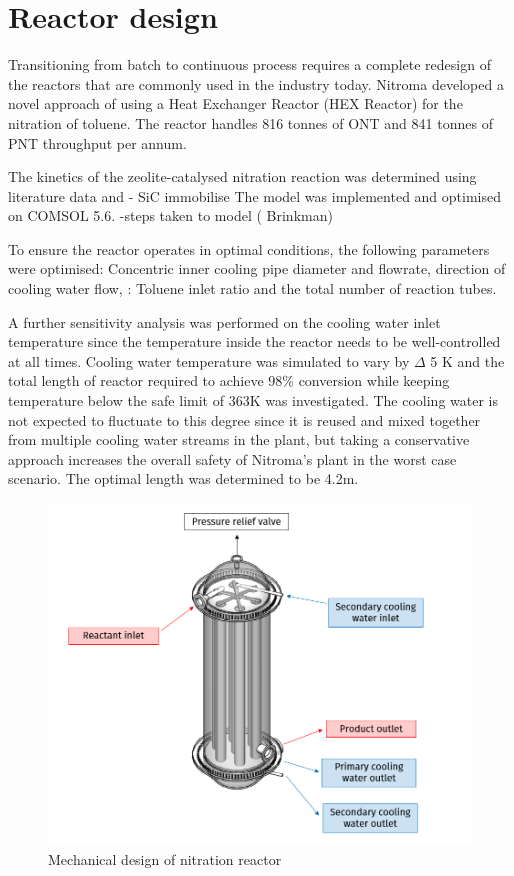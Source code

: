 \section*{Reactor design}
Transitioning from batch to continuous process requires a complete redesign of the reactors that are commonly used in the industry today. Nitroma developed a novel approach of using a Heat Exchanger Reactor (HEX Reactor) for the nitration of toluene. The reactor handles 816 tonnes of ONT and 841 tonnes of PNT throughput per annum. 

The kinetics of the zeolite-catalysed nitration reaction was determined using literature data and 
- SiC immobilise
The model was implemented and optimised on COMSOL 5.6. 
-steps taken to model ( Brinkman) 

To ensure the reactor operates in optimal conditions, the following parameters were optimised: Concentric inner cooling pipe diameter and flowrate, direction of cooling water flow,  : Toluene inlet ratio and the total number of reaction tubes.



A further sensitivity analysis was performed on the cooling water inlet temperature since the temperature inside the reactor needs to be well-controlled at all times. Cooling water temperature was simulated to vary by \mypm $\Delta$ 5 K and the total length of reactor required to achieve 98\% conversion while keeping temperature below the safe limit of 363K was investigated. The cooling water is not expected to fluctuate to this degree since it is reused and mixed together from multiple cooling water streams in the plant, but taking a conservative approach increases the overall safety of Nitroma's plant in the worst case scenario. The optimal length was determined to be 4.2m. 


\begin{figure}[h]
    \centering
    \includegraphics[width=0.7\linewidth]{chapters/0-executive-summary/figures/FYD executive sum.PNG}
    \caption{Mechanical design of nitration reactor}
    \label{fig:executivesummaryreactor}
\end{figure}